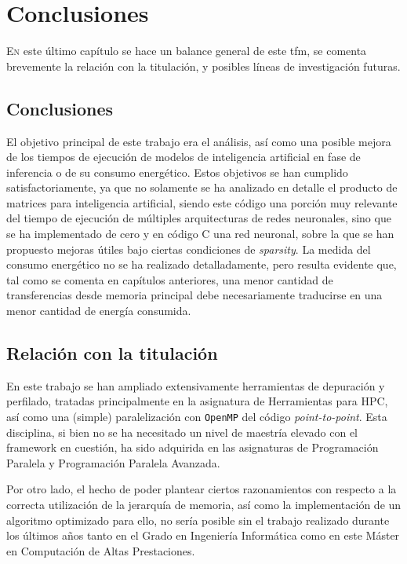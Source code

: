 \chapter{Conclusiones}
\label{chap:conclusiones}

\lettrine{E}{n} este último capítulo se hace un balance general de este \acrlong{tfm}, se comenta brevemente la relación con la titulación, y posibles líneas de investigación futuras.

\section{Conclusiones}
El objetivo principal de este trabajo era el análisis, así como una posible mejora de los tiempos de ejecución de modelos de inteligencia artificial en fase de inferencia o de su consumo energético. Estos objetivos se han cumplido satisfactoriamente, ya que no solamente se ha analizado en detalle el producto de matrices para inteligencia artificial, siendo este código una porción muy relevante del tiempo de ejecución de múltiples arquitecturas de redes neuronales, sino que se ha implementado de cero y en código C una red neuronal, sobre la que se han propuesto mejoras útiles bajo ciertas condiciones de \textit{sparsity}. La medida del consumo energético no se ha realizado detalladamente, pero resulta evidente que, tal como se comenta en capítulos anteriores, una menor cantidad de transferencias desde memoria principal debe necesariamente traducirse en una menor cantidad de energía consumida.

\section{Relación con la titulación}
En este trabajo se han ampliado extensivamente herramientas de depuración y perfilado, tratadas principalmente en la asignatura de Herramientas para HPC, así como una (simple) paralelización con \texttt{OpenMP} del código \textit{point-to-point}. Esta disciplina, si bien no se ha necesitado un nivel de maestría elevado con el framework en cuestión, ha sido adquirida en las asignaturas de Programación Paralela y Programación Paralela Avanzada.

Por otro lado, el hecho de poder plantear ciertos razonamientos con respecto a la correcta utilización de la jerarquía de memoria, así como la implementación de un algoritmo optimizado para ello, no sería posible sin el trabajo realizado durante los últimos años tanto en el Grado en Ingeniería Informática como en este Máster en Computación de Altas Prestaciones.

